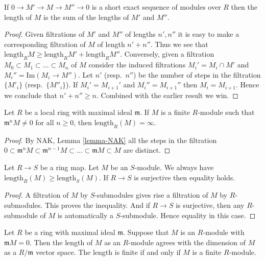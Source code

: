 \begin{lemma}
\label{lemma-length-additive}
If $0 \to M' \to M \to M'' \to 0$
is a short exact sequence of modules over $R$ then
the length of $M$ is the sum of the
lengths of $M'$ and $M''$.
\end{lemma}

\begin{proof}
Given filtrations of $M'$ and $M''$ of lengths $n', n''$
it is easy to make a corresponding filtration of $M$
of length $n' + n''$. Thus we see that $\text{length}_R M
\geq \text{length}_R M' + \text{length}_R M''$.
Conversely, given a filtration
$M_0 \subset M_1 \subset \ldots \subset M_n$ of
$M$ consider the induced filtrations
$M_i' = M_i \cap M'$ and $M_i'' = \text{Im}(M_i \to M'')$.
Let $n'$ (resp.\ $n''$) be the number of steps in the filtration
$\{M'_i\}$ (resp.\ $\{M''_i\}$).
If $M_i' = M_{i + 1}'$ and $M_i'' = M_{i + 1}''$ then
$M_i = M_{i + 1}$. Hence we conclude that $n' + n'' \geq n$.
Combined with the earlier result we win.
\end{proof}

\begin{lemma}
\label{lemma-length-infinite}
Let $R$ be a local ring with maximal ideal $\mathfrak m$.
If $M$ is a finite $R$-module such that
$\mathfrak m^n M \not = 0$ for all $n\geq 0$,
then $\text{length}_R(M) = \infty$.
\end{lemma}

\begin{proof}
By NAK, Lemma \ref{lemma-NAK} all the steps in the filtration
$0 \subset \mathfrak m^n M
\subset \mathfrak m^{n-1} M \subset \ldots \subset
\mathfrak m M \subset M$ are distinct.
\end{proof}

\begin{lemma}
\label{lemma-length-independent}
Let $R \to S$ be a ring map. Let $M$ be an $S$-module.
We always have $\text{length}_R(M) \geq \text{length}_S(M)$.
If $R \to S$ is surjective then equality holds.
\end{lemma}

\begin{proof}
A filtration of $M$ by $S$-submodules gives rise a filtration
of $M$ by $R$-submodules. This proves the inequality.
And if $R \to S$ is surjective, then any $R$-submodule
of $M$ is automatically a $S$-submodule. Hence equality
in this case.
\end{proof}

\begin{lemma}
\label{lemma-dimension-is-length}
Let $R$ be a ring with maximal ideal $\mathfrak m$.
Suppose that $M$ is an $R$-module with
$\mathfrak m M  =  0$. Then the length of $M$ as
an $R$-module agrees with the dimension of $M$ as
a $R/\mathfrak m$ vector space.
The length is finite if and only if $M$ is a finite $R$-module.
\end{lemma}

